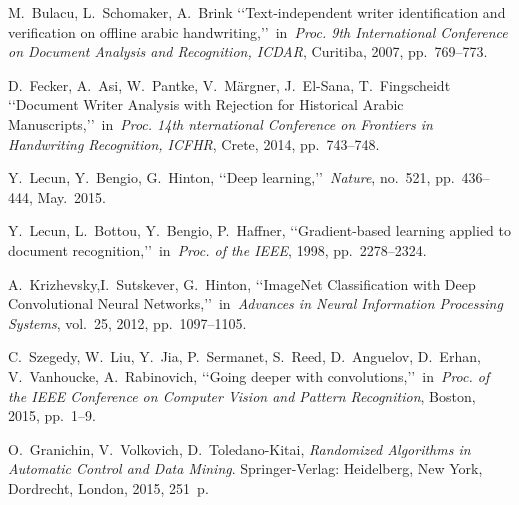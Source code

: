 \documentclass[conference,a4paper,twocolumn]{IEEEtran}
\begin{document}
\begin{thebibliography}{99}

 M.~Bulacu, L.~Schomaker, A.~Brink \lq\lq Text-independent writer identification and verification on offline arabic handwriting,\rq\rq~in~\emph{Proc. 9th International Conference on Document Analysis and Recognition, ICDAR}, Curitiba, 2007, pp.~769--773.

 D.~Fecker, A.~Asi, W.~Pantke, V.~Märgner, J.~El-Sana, T.~Fingscheidt \lq\lq Document Writer Analysis with Rejection for Historical Arabic Manuscripts,\rq\rq~in~\emph{Proc. 14th nternational Conference on Frontiers in Handwriting Recognition, ICFHR}, Crete, 2014, pp.~743--748.

 Y.~Lecun, Y.~Bengio, G.~Hinton, \lq\lq Deep learning,\rq\rq~\emph{Nature}, no.~521, pp.~436--444, May.~2015.

 Y.~Lecun, L.~Bottou, Y.~Bengio, P.~Haffner, \lq\lq Gradient-based learning applied to document recognition,\rq\rq~in~\emph{Proc. of the IEEE}, 1998, pp.~2278--2324.

 A.~Krizhevsky,I.~Sutskever, G.~Hinton, \lq\lq ImageNet Classification with Deep Convolutional Neural Networks,\rq\rq~in~\emph{Advances in Neural Information Processing Systems}, vol.~25, 2012, pp.~1097--1105.

 C.~Szegedy, W.~Liu, Y.~Jia, P.~Sermanet, S.~Reed, D.~Anguelov, D.~Erhan, V.~Vanhoucke, A.~Rabinovich, \lq\lq Going deeper with convolutions,\rq\rq~in~\emph{Proc. of the IEEE Conference on Computer Vision and Pattern Recognition}, Boston, 2015, pp.~1--9.

 O.~Granichin, V.~Volkovich, D.~Toledano-Kitai, \emph{Randomized Algorithms in Automatic Control and Data Mining}. Springer-Verlag: Heidelberg, New York, Dordrecht, London, 2015, 251~p.

\end{thebibliography}


\end{document}
